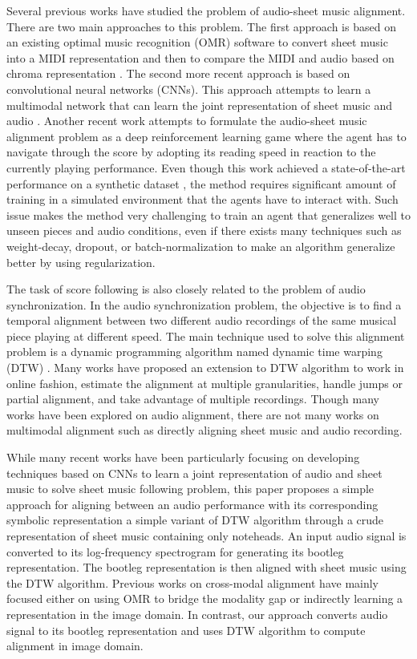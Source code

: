 \documentclass[letterpaper, 10pt, conference]{ieeeconf}  %
\begin{document}
Several previous works have studied the problem of audio-sheet music alignment. There are two main approaches to this problem. The first approach is based on an existing optimal music recognition (OMR) software to convert sheet music into a MIDI representation and then to compare the MIDI and audio based on chroma representation \cite{omr_based1, omr_based2}. The second more recent approach is based on convolutional neural networks (CNNs). This approach attempts to learn a multimodal network that can learn the joint representation of sheet music and audio \cite{dorfer2, dorfer3}. Another recent work \cite{dorfer} attempts to formulate the audio-sheet music alignment problem as a deep reinforcement learning game where the agent has to navigate through the score by adopting its reading speed in reaction to the currently playing performance. Even though this work \cite{dorfer} achieved a state-of-the-art performance on a synthetic dataset \cite{msmd}, the method requires significant amount of training in a simulated environment that the agents have to interact with. Such issue makes the method very challenging to train an agent that generalizes well to unseen pieces and audio conditions, even if there exists many techniques such as weight-decay, dropout, or batch-normalization to make an algorithm generalize better by using regularization.

The task of score following is also closely related to the problem of audio synchronization. In the audio synchronization problem, the objective is to find a temporal alignment between two different audio recordings of the same musical piece playing at different speed. The main technique used to solve this alignment problem is a dynamic programming algorithm named dynamic time warping (DTW) \cite{dtw1, dtw2}. Many works have proposed an extension to DTW algorithm to work in online fashion, estimate the alignment at multiple granularities, handle jumps or partial alignment, and take advantage of multiple recordings. Though many works have been explored on audio alignment, there are not many works on multimodal alignment such as directly aligning sheet music and audio recording.

While many recent works have been particularly focusing on developing techniques based on CNNs to learn a joint representation of audio and sheet music to solve sheet music following problem, this paper proposes a simple approach for aligning between an audio performance with its corresponding symbolic representation a simple variant of DTW algorithm through a crude representation of sheet music containing only noteheads. An input audio signal is converted to its log-frequency spectrogram for generating its bootleg representation. The bootleg representation is then aligned with sheet music using the DTW algorithm. Previous works on cross-modal alignment have mainly focused either on using OMR to bridge the modality gap or indirectly learning a representation in the image domain. In contrast, our approach converts audio signal to its bootleg representation and uses DTW algorithm to compute alignment in image domain.
\end{document}
